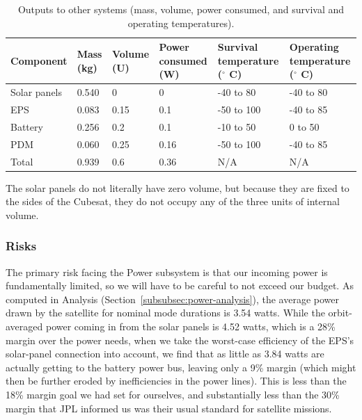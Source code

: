 \documentclass[12pt]{article}
\begin{document}
\begin{table}[ht]\label{table:power-outputs}
\caption{Outputs to other systems (mass, volume, power consumed, and survival and operating temperatures).\cite{EPS-manual} \cite{PDM-manual} \cite{Battery-manual} \cite{Solar-panel-datasheet}}
\begin{center}
    \begin{tabular}{|l|l|l|p{0.8in}|p{1in}|p{1.1in}|} \hline
Component & Mass (kg) & Volume (U) & Power consumed (W) & Survival temperature ($^\circ$ C) & Operating temperature ($^\circ$ C) \\ \hline \hline
Solar panels & 0.540 & 0 & 0 & -40 to 80 & -40 to 80 \\\hline
EPS & 0.083 & 0.15 & 0.1 & -50 to 100 & -40 to 85 \\\hline
Battery & 0.256 & 0.2 & 0.1 & -10 to 50 & 0 to 50 \\\hline
PDM & 0.060 & 0.25 & 0.16 & -50 to 100 & -40 to 85 \\\hline \hline
Total & 0.939 & 0.6 & 0.36 & N/A & N/A \\\hline
    \end{tabular}
\end{center}
\end{table}

The solar panels do not literally have zero volume, but because they are fixed to the sides of the Cubesat, they do not occupy any of the three units of internal volume.

			\subsubsection{Risks}

The primary risk facing the Power subsystem is that our incoming power is fundamentally limited, so we will have to be careful to not exceed our budget.  As computed in Analysis (Section~\ref{subsubsec:power-analysis}), the average power drawn by the satellite for nominal mode durations is 3.54 watts.  While the orbit-averaged power coming in from the solar panels is 4.52 watts, which is a 28\% margin over the power needs, when we take the worst-case efficiency of the EPS's solar-panel connection into account\cite{EPS-manual}, we find that as little as 3.84 watts are actually getting to the battery power bus, leaving only a 9\% margin (which might then be further eroded by inefficiencies in the power lines).  This is less than the 18\% margin goal we had set for ourselves, and substantially less than the 30\% margin that JPL informed us was their usual standard for satellite missions.
\end{document}
